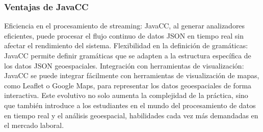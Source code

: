 \subsubsection{Ventajas de JavaCC}

Eficiencia en el procesamiento de streaming: JavaCC, al generar analizadores eficientes, puede procesar el flujo continuo de datos JSON en tiempo real sin afectar el rendimiento del sistema.
Flexibilidad en la definición de gramáticas: JavaCC permite definir gramáticas que se adapten a la estructura específica de los datos JSON geoespaciales.
Integración con herramientas de visualización: JavaCC se puede integrar fácilmente con herramientas de visualización de mapas, como Leaflet o Google Maps, para representar los datos geoespaciales de forma interactiva.
Este evolutivo no solo aumenta la complejidad de la práctica, sino que también introduce a los estudiantes en el mundo del procesamiento de datos en tiempo real y el análisis geoespacial, habilidades cada vez más demandadas en el mercado laboral.
